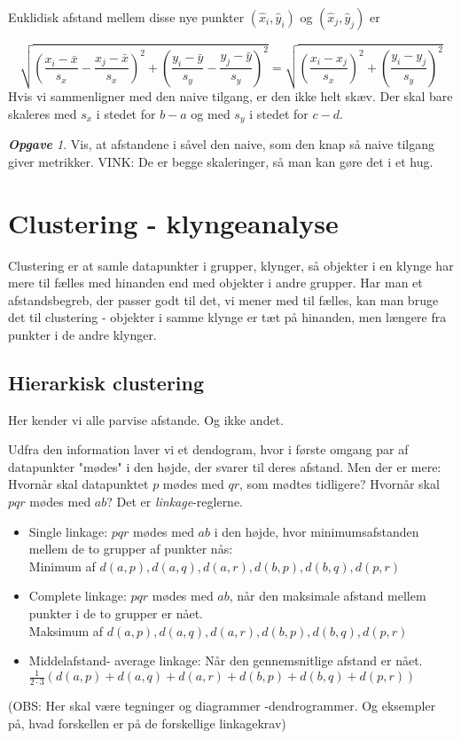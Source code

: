 \documentclass[a4paper, 12pt]{article}
\theoremstyle{remark}
\newtheorem{Opgave}{\textbf{Opgave}}
\begin{document}
Euklidisk afstand mellem disse nye punkter $(\hat{x}_i,\hat{y}_i)$ og  $(\hat{x}_j,\hat{y}_j)$ er 

$$\sqrt{\left(\frac{x_i-\bar{x}}{s_x}-\frac{x_j-\bar{x}}{s_x}\right)^2 +\left(\frac{y_i-\bar{y}}{s_y}-\frac{y_j-\bar{y}}{s_y}\right)^2}=\sqrt{\left(\frac{x_i-x_j}{s_x}\right)^2+\left(\frac{y_i-y_j}{s_y}\right)^2}$$
Hvis vi sammenligner med den naive tilgang, er den ikke helt skæv. Der skal bare skaleres med $s_x$ i stedet for $b-a$ og med $s_y$ i stedet for $c-d$.
\begin{Opgave}
Vis, at afstandene i såvel den naive, som den knap så naive tilgang giver metrikker. VINK: De er begge skaleringer, så man kan gøre det i et hug. 
\end{Opgave}
\section*{Clustering - klyngeanalyse}

Clustering er at samle datapunkter i grupper, klynger, så objekter i en klynge har mere til fælles med hinanden end med objekter i andre grupper. Har man et afstandsbegreb, der passer godt til det, vi mener med til fælles, kan man bruge det til clustering - objekter i samme klynge er tæt på hinanden, men længere fra punkter i de andre klynger. 
\subsection*{Hierarkisk clustering}
Her kender vi alle parvise afstande. Og ikke andet. 

Udfra den information laver vi et dendogram, hvor i første omgang par af datapunkter "mødes"\; i den højde, der svarer til deres afstand. Men der er mere: Hvornår skal datapunktet $p$ mødes med $qr$, som mødtes tidligere? Hvornår skal $pqr$ mødes med $ab$?  Det er \emph{linkage}-reglerne.
\begin{itemize}
\item Single linkage: $pqr$ mødes med $ab$ i den højde, hvor minimumsafstanden mellem de to grupper af punkter nås:\\ Minimum af $d(a,p),d(a,q), d(a,r), d(b,p), d(b,q), d(p,r)$
\item Complete linkage: $pqr$ mødes med $ab$, når den maksimale afstand mellem punkter i de to grupper er nået. \\Maksimum af $d(a,p),d(a,q), d(a,r), d(b,p), d(b,q), d(p,r)$
\item Middelafstand- average linkage: Når den gennemsnitlige afstand er nået. $\frac{1}{2\cdot 3}(d(a,p)+d(a,q)+ d(a,r)+ d(b,p)+ d(b,q)+ d(p,r))$
\end{itemize}
(OBS: Her skal være tegninger og diagrammer -dendrogrammer. Og eksempler på, hvad forskellen er på de forskellige linkagekrav)
\end{document}
